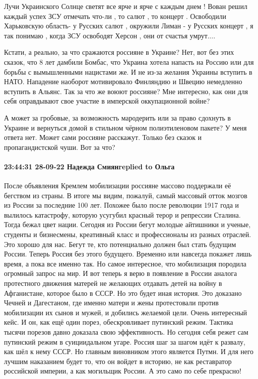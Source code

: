 Лучи Украинского  Солнце   светят все ярче и ярче с каждым днем ! Вован решил
каждый успех ЗСУ отмечать что-ли , то салют , то концерт . Освободили
Харьковскую область- у Русских  салют , окружили Лиман - у Русских  концерт , я
так понимаю ,  когда ЗСУ освободят Херсон , они от счастья умрут....




Кстати, а реально, за что сражаются россияне в Украине? Нет, вот без этих
сказок, что 8 лет дамбили Бомбас, что Украина хотела напасть на Россию или для
борьбы с вымышленными нацистами же. И не из-за желания Украины вступить в НАТО.
Нападение наоборот мотивировало Финляндию и Швецию немедленно вступить в
Альянс. Так за что же воюют россияне? Мне интересно, как они для себя
оправдывают свое участие в имперской оккупационной войне?

А может за гробовые, за возможность мародерить или за право сдохнуть в Украине
и вернуться домой в стильном чёрном полиэтиленовом пакете? У меня ответа нет.
Может сами россияне расскажут. Только без сказок и пропагандистской чуши. Вот
за что?


\paragraph{23:44:31 28-09-22 Надежда Смиянreplied to Ольга}
После объявления Кремлем мобилизации россияне массово поддержали её бегством из страны. В итоге мы видим, пожалуй, самый массовый отток мозгов из России за последние 100 лет. Похожее было после революции 1917 года и вылилось катастрофу, которую усугубил красный терор и репрессии Сталина. Тогда бежал цвет нации.
Сегодня из России бегут молодые айтишники и ученые, студенты и бизнесмены, креативный класс и профессионалы из разных отраслей. Это хорошо для нас. Бегут те, кто потенциально должен был стать будущим России. Теперь Россия без этого будущего. Временно или навсегда покажет лишь время, а пока все именно так.
Но самое интересное, что мобилизация породила огромный запрос на мир. И вот теперь я верю в появление в России аналога протестного движения матерей не желающих отдавать детей на войну в Афганистане, которое было в СССР. Но это будет иная история. Это доказано Чечней и Дагестаном, где именно матери и жены протестовали против мобилизации их сынов и мужей, и добились желаемой цели. Очень интересный кейс. И он, как ещё один порез, обескровливает путинский режим. Тактика тысячи порезов давно доказала свою эффективность. Но сегодня себя режет сам путинский режим в суициидальном угаре.
Россия шаг за шагом идёт к развалу, как шёл к нему СССР. Но главным виновником этого является Путмн. И для него лучшим наказанием будет то, что он войдет в историю, не как реставратор российской империи, а как могильщик России. А это само по себе прекрасно!


